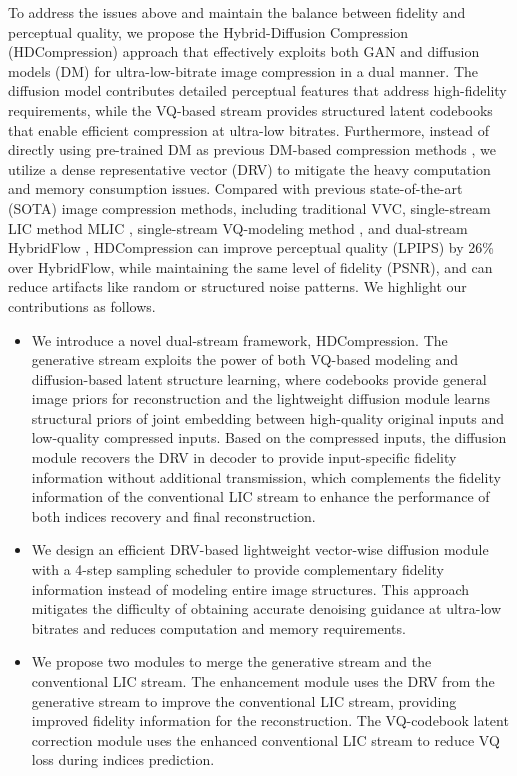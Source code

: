To address the issues above and maintain the balance between fidelity and perceptual quality, we propose the Hybrid-Diffusion Compression (HDCompression) approach that effectively exploits both GAN and diffusion models (DM) for ultra-low-bitrate image compression in a dual manner. The diffusion model contributes detailed perceptual features that address high-fidelity requirements, while the VQ-based stream provides structured latent codebooks that enable efficient compression at ultra-low bitrates. Furthermore, instead of directly using pre-trained DM as previous DM-based compression methods \cite{relic2024lossy}, we utilize a dense representative vector (DRV) to mitigate the heavy computation and memory consumption issues. Compared with previous state-of-the-art (SOTA) image compression methods, including traditional VVC, single-stream LIC method MLIC \cite{mlic2023}, single-stream VQ-modeling method \cite{vqganmasiwei}, and dual-stream HybridFlow \cite{lu2024hybridflow}, HDCompression can improve perceptual quality (LPIPS) by 26\% over HybridFlow, while maintaining the same level of fidelity (PSNR), and can reduce artifacts like random or structured noise patterns.  
We highlight our contributions as follows.
\begin{itemize}
    \item We introduce a novel dual-stream framework, HDCompression. The generative stream exploits the power of both VQ-based modeling and diffusion-based latent structure learning, where codebooks provide general image priors for reconstruction and the lightweight diffusion module learns structural priors of joint embedding between high-quality original inputs and low-quality compressed inputs. Based on the compressed inputs, the diffusion module recovers the DRV in decoder to provide input-specific fidelity information without additional transmission, which complements the fidelity information of the conventional LIC stream to enhance the performance of both indices recovery and final reconstruction.  
    
    \item We design an efficient DRV-based lightweight vector-wise diffusion module with a 4-step sampling scheduler to provide complementary fidelity information instead of modeling entire image structures. This approach mitigates the difficulty of obtaining accurate denoising guidance at ultra-low bitrates and reduces computation and memory requirements.
    
    \item We propose two modules to merge the generative stream and the conventional LIC stream. The enhancement module uses the DRV from the generative stream to improve the conventional LIC stream, providing improved fidelity information for the reconstruction. The VQ-codebook latent correction module uses the enhanced conventional LIC stream to reduce VQ loss during indices prediction. 
\end{itemize}


